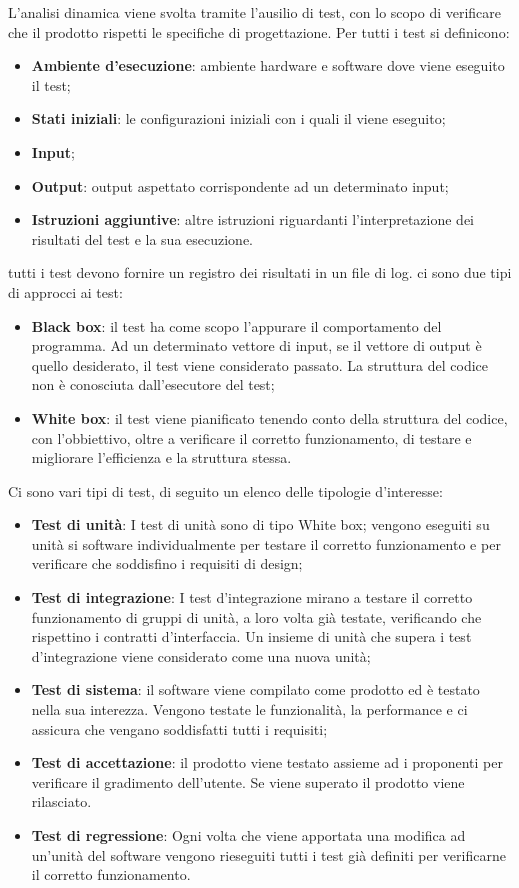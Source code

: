 	L'analisi dinamica viene svolta tramite l'ausilio di test, con lo scopo di verificare che il prodotto rispetti le specifiche di progettazione.
	Per tutti i test si definicono:
	\begin{itemize}
	    \item \textbf{Ambiente d'esecuzione}: ambiente hardware e software dove viene eseguito il test;
	    \item \textbf{Stati iniziali}: le configurazioni iniziali con i quali il viene eseguito;
	    \item \textbf{Input};
	    \item \textbf{Output}: output aspettato corrispondente ad un determinato input;
	    \item \textbf{Istruzioni aggiuntive}: altre istruzioni riguardanti l'interpretazione dei risultati del test e la sua esecuzione.
	\end{itemize}
	tutti i test devono fornire un registro dei risultati in un file di log.
	ci sono due tipi di approcci ai test:
	\begin{itemize}
	    \item \textbf{Black box}: il test ha come scopo l'appurare il comportamento del programma. Ad un determinato vettore di input, se il vettore di output è quello desiderato, il test viene considerato passato. La struttura del codice non è conosciuta dall'esecutore del test; 
	    \item \textbf{White box}: il test viene pianificato tenendo conto della struttura del codice, con l'obbiettivo, oltre a verificare il corretto funzionamento, di testare e migliorare l'efficienza e la struttura stessa. 
	\end{itemize}
	Ci sono vari tipi di test, di seguito un elenco delle tipologie d'interesse:
	\begin{itemize}
	    \item \textbf{Test di unità}: I test di unità sono di tipo White box; vengono eseguiti su unità si software individualmente per testare il corretto funzionamento e per verificare che soddisfino i requisiti di design;
	    \item \textbf{Test di integrazione}: I test d'integrazione mirano a testare il corretto funzionamento di gruppi di unità, a loro volta già testate, verificando che rispettino i contratti d'interfaccia. Un insieme di unità che supera i test d'integrazione viene considerato come una nuova unità;
	    \item \textbf{Test di sistema}: il software viene compilato come prodotto ed è testato nella sua interezza. Vengono testate le funzionalità, la performance e ci assicura che vengano soddisfatti tutti i requisiti;
	    \item \textbf{Test di accettazione}: il prodotto viene testato assieme ad i proponenti per verificare il gradimento dell'utente. Se viene superato il prodotto viene rilasciato.
	    \item \textbf{Test di regressione}: Ogni volta che viene apportata una modifica ad un'unità del software vengono rieseguiti tutti i test già definiti per verificarne il corretto funzionamento.
	\end{itemize}
